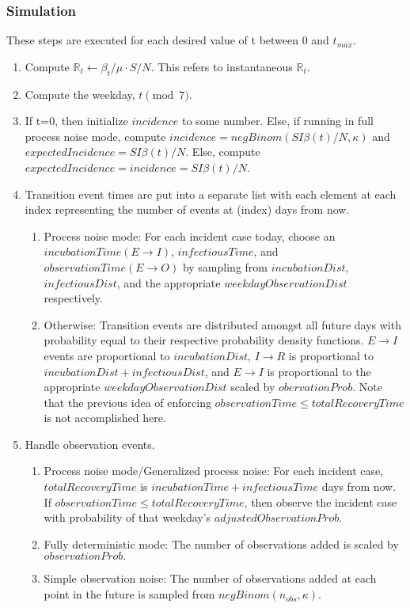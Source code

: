 \documentclass{article}
\newcommand{\nR}{\mathbb{R}}
\begin{document}
\subsubsection{Simulation}
These steps are executed for each desired value of t between 0 and $t_{max}$.
\begin{enumerate}
    \item Compute $\nR_t \gets \beta_t/\mu \cdot S/N$. This refers to instantaneous $\nR_t$.
    
    \item Compute the weekday, $t \pmod 7$.
    
    \item If t=0, then initialize $incidence$ to some number. Else, if running in full process noise mode, compute $incidence = negBinom(SI\beta(t)/N, \kappa)$ and $expectedIncidence = SI\beta(t)/N$. Else, compute $expectedIncidence = incidence = SI\beta(t)/N$.
    
    \item Transition event times are put into a separate list with each element at each index representing the number of events at (index) days from now. 
        \begin{enumerate}
            \item Process noise mode: For each incident case today, choose an \linebreak $incubationTime (E \rightarrow I)$, $infectiousTime$, and $observationTime (E \rightarrow O)$ by sampling from $incubationDist$, $infectiousDist$, and the appropriate $weekdayObservationDist$ respectively. 
            
            \item Otherwise: Transition events are distributed amongst all future days with probability equal to their respective probability density functions. $E \rightarrow I$ events are proportional to $incubationDist$, $I \rightarrow R$ is proportional to $incubationDist + infectiousDist$, and $E \rightarrow I$ is proportional to the appropriate $weekdayObservationDist$ scaled by $obervationProb$. Note that the previous idea of enforcing \linebreak $observationTime \leq totalRecoveryTime$ is not accomplished here.

        \end{enumerate}

    \item Handle observation events.
        \begin{enumerate}
            \item Process noise mode/Generalized process noise: For each incident case, $totalRecoveryTime$ is $incubationTime + infectiousTime$ days from now. If $observationTime \leq totalRecoveryTime$, then observe the incident case with probability of that weekday's \linebreak $adjustedObservationProb$. 
            \item Fully deterministic mode: The number of observations added is scaled by $observationProb.$
            \item Simple observation noise: The number of observations added at each point in the future is sampled from $negBinom(n_{obs}, \kappa)$.


\end{enumerate}
\end{enumerate}
\end{document}

